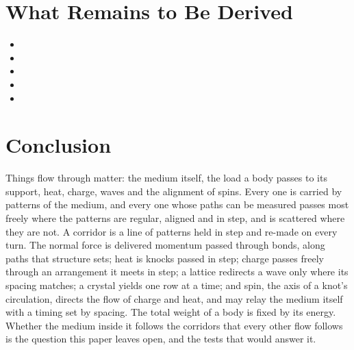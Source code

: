 \documentclass[11pt,a4paper]{article}
\begin{document}
\section{What Remains to Be Derived}
\label{sec:owed}

\begin{itemize}
\item {}
\item {}
\item {}
\item {}
\item {}
\end{itemize}

\section*{Conclusion}

Things flow through matter: the medium itself, the load a body passes to its support, heat, charge, waves and the alignment of spins. Every one is carried by patterns of the medium, and every one whose paths can be measured passes most freely where the patterns are regular, aligned and in step, and is scattered where they are not. A corridor is a line of patterns held in step and re-made on every turn. The normal force is delivered momentum passed through bonds, along paths that structure sets; heat is knocks passed in step; charge passes freely through an arrangement it meets in step; a lattice redirects a wave only where its spacing matches; a crystal yields one row at a time; and spin, the axis of a knot's circulation, directs the flow of charge and heat, and may relay the medium itself with a timing set by spacing. The total weight of a body is fixed by its energy. Whether the medium inside it follows the corridors that every other flow follows is the question this paper leaves open, and the tests that would answer it.
\end{document}
